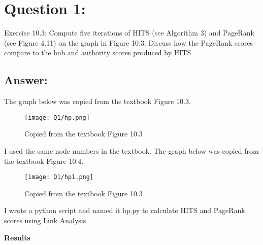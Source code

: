 \section*{Question 1:}
Exercise 10.3: 
Compute five iterations of HITS (see Algorithm 3) and PageRank (see Figure 4.11) on the graph in Figure 10.3. Discuss how the PageRank scores compare to the hub and authority scores produced by HITS

\subsection*{Answer:}

The graph below was copied from the textbook Figure 10.3. 


\begin{figure}[h]
\caption{Copied from the textbook Figure 10.3}
\centering
\texttt{[image: Q1/hp.png]}
\end{figure}

I used the same node numbers in the textbook. The graph below was copied from the textbook Figure 10.4.

\begin{figure}[h]
\caption{Copied from the textbook Figure 10.3}
\centering
\texttt{[image: Q1/hp1.png]}
\end{figure}


I wrote a python script and named it hp.py to calculate HITS and PageRank scores using Link Analysis.





\textbf{Results}


